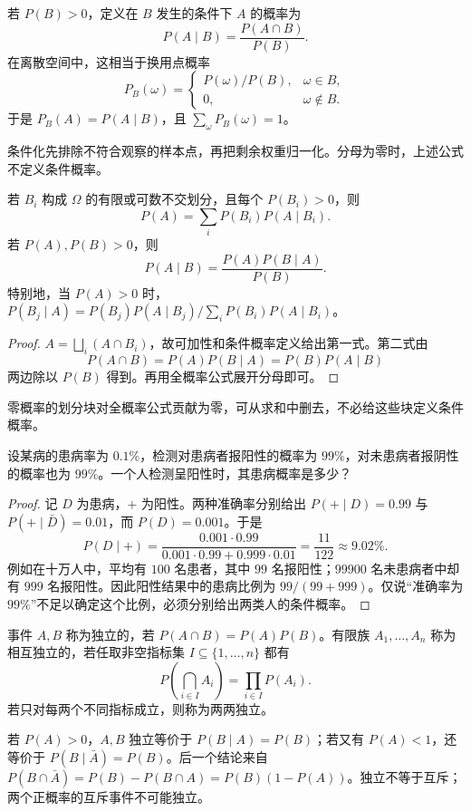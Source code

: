 \documentclass[lang=cn,a4paper,fontset=none,zihao=false,10pt,openany,twoside]{beautybook}
\numberwithin{algorithm}{chapter}
\begin{document}
\begin{definition}[条件概率]\label{def:conditional-probability}
若 $P(B)>0$，定义在 $B$ 发生的条件下 $A$ 的概率为
\[
 P(A\mid B)=\frac{P(A\cap B)}{P(B)}.
\]
在离散空间中，这相当于换用点概率
\[
 P_B(\omega)=\begin{cases}P(\omega)/P(B),&\omega\in B,\\0,&\omega\notin B.\end{cases}
\]
于是 $P_B(A)=P(A\mid B)$，且 $\sum_\omega P_B(\omega)=1$。
\end{definition}
条件化先排除不符合观察的样本点，再把剩余权重归一化。分母为零时，上述公式不定义条件概率。

\begin{proposition}\label{prop:bayes-total}
若 $B_i$ 构成 $\Omega$ 的有限或可数不交划分，且每个 $P(B_i)>0$，则
\[
 P(A)=\sum_i P(B_i)P(A\mid B_i).
\]
若 $P(A),P(B)>0$，则
\[
 P(A\mid B)=\frac{P(A)P(B\mid A)}{P(B)}.
\]
特别地，当 $P(A)>0$ 时，$P(B_j\mid A)=P(B_j)P(A\mid B_j)/\sum_iP(B_i)P(A\mid B_i)$。
\end{proposition}
\begin{proof}
$A=\bigsqcup_i(A\cap B_i)$，故可加性和条件概率定义给出第一式。第二式由
\[
 P(A\cap B)=P(A)P(B\mid A)=P(B)P(A\mid B)
\]
两边除以 $P(B)$ 得到。再用全概率公式展开分母即可。
\end{proof}
零概率的划分块对全概率公式贡献为零，可从求和中删去，不必给这些块定义条件概率。

\begin{example}[检测结果与患病概率]\label{ex:probability-test}
设某病的患病率为 $0.1\%$，检测对患病者报阳性的概率为 $99\%$，对未患病者报阴性的概率也为 $99\%$。一个人检测呈阳性时，其患病概率是多少？
\end{example}
\begin{proof}
记 $D$ 为患病，$+$ 为阳性。两种准确率分别给出 $P(+\mid D)=0.99$ 与 $P(+\mid \bar{D})=0.01$，而 $P(D)=0.001$。于是
\[
 P(D\mid +)=\frac{0.001\cdot0.99}{0.001\cdot0.99+0.999\cdot0.01}
 =\frac{11}{122}\approx9.02\%.
\]
例如在十万人中，平均有 $100$ 名患者，其中 $99$ 名报阳性；$99900$ 名未患病者中却有 $999$ 名报阳性。因此阳性结果中的患病比例为 $99/(99+999)$。仅说“准确率为 $99\%$”不足以确定这个比例，必须分别给出两类人的条件概率。
\end{proof}

\begin{definition}[事件的独立性]\label{def:event-independence}
事件 $A,B$ 称为独立的，若 $P(A\cap B)=P(A)P(B)$。有限族 $A_1,\ldots,A_n$ 称为相互独立的，若任取非空指标集 $I\subseteq\{1,\ldots,n\}$ 都有
\[
 P\left(\bigcap_{i\in I}A_i\right)=\prod_{i\in I}P(A_i).
\]
若只对每两个不同指标成立，则称为两两独立。
\end{definition}
若 $P(A)>0$，$A,B$ 独立等价于 $P(B\mid A)=P(B)$；若又有 $P(A)<1$，还等价于 $P(B\mid \bar{A})=P(B)$。后一个结论来自
$P(B\cap \bar{A})=P(B)-P(B\cap A)=P(B)(1-P(A))$。独立不等于互斥；两个正概率的互斥事件不可能独立。
\end{document}
